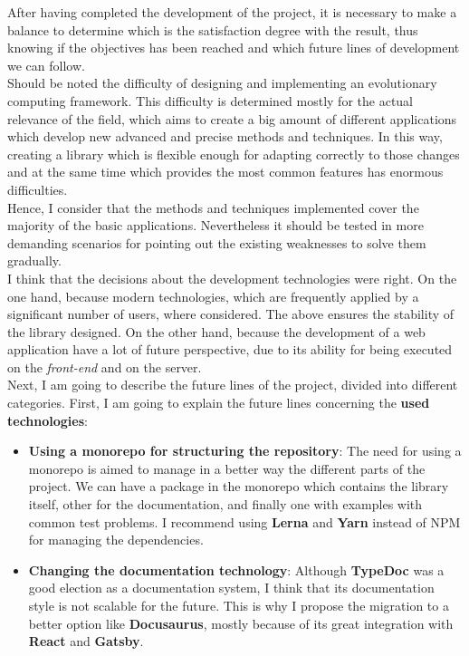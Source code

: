 

After having completed the development of the project, it is necessary to make a balance to determine which is the satisfaction degree with the result, thus knowing if the objectives has been reached and which future lines of development we can follow. \\

Should be noted the difficulty of designing and implementing an evolutionary computing framework. This difficulty is determined mostly for the actual relevance of the field, which aims to create a big amount of different applications which develop new advanced and precise methods and techniques. In this way, creating a library which is flexible enough for adapting correctly to those changes and at the same time which provides the most common features has enormous difficulties. \\

Hence, I consider that the methods and techniques implemented cover the majority of the basic applications. Nevertheless it should be tested in more demanding scenarios for pointing out the existing weaknesses to solve them gradually. \\

I think that the decisions about the development technologies were right. On the one hand, because modern technologies, which are frequently applied by a significant number of users, where considered. The above ensures the stability of the library designed. On the other hand, because the development of a web application have a lot of future perspective, due to its ability for being executed on the \textit{front-end} and on the server. \\

Next, I am going to describe the future lines of the project, divided into different categories. First, I am going to explain the future lines concerning the \textbf{used technologies}:

\begin{itemize}
    \item \textbf{Using a monorepo for structuring the repository}: The need for using a monorepo is aimed to manage in a better way the different parts of the project. We can have a package in the monorepo which contains the library itself, other for the documentation, and finally one with examples with common test problems. I recommend using \textbf{Lerna} and \textbf{Yarn} instead of NPM for managing the dependencies.
    \item \textbf{Changing the documentation technology}: Although \textbf{TypeDoc} was a good election as a documentation system, I think that its documentation style is not scalable for the future. This is why I propose the migration to a better option like \textbf{Docusaurus}, mostly because of its great integration with \textbf{React} and \textbf{Gatsby}.
\end{itemize}

